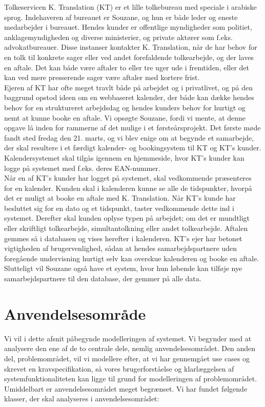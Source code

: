 \documentclass[12pt]{article}   %
\begin{document}
Tolkeservicen K. Translation (KT) er et lille tolkebureau med speciale i arabiske 
sprog. Indehaveren af bureauet er Souzane, og hun er både leder og eneste
medarbejder i bureauet. Hendes kunder er offentlige myndigheder som
politiet, anklagemyndigheden og diverse ministerier, og private aktører som f.eks. advokatbureauer. Disse instanser kontakter K. Translation, når de har
behov for en tolk til konkrete sager eller ved andet forefaldende
tolkearbejde, og der laves en aftale. Det kan både være aftaler to eller tre uger 
ude i fremtiden, eller det kan ved mere presserende sager være aftaler med
kortere frist.\\
Ejeren af KT har ofte meget travlt både på arbejdet og i privatlivet, og på
den baggrund opstod ideen om en webbaseret kalender, der både kan dække hendes behov for en struktureret arbejdsdag og hendes kunders behov for hurtigt og nemt at kunne booke en aftale. Vi opsøgte Souzane, fordi vi mente, at denne opgave lå inden for
rammerne af det mulige i et førsteårsprojekt. Det første møde fandt 
sted fredag den 21. marts, og vi blev enige om at begynde et samarbejde, der
skal resultere i et færdigt kalender- og bookingsystem til KT og KT's kunder.
Kalendersystemet skal tilgås igennem en hjemmeside, hvor KT's kunder
kan logge på systemet med f.eks. deres EAN-nummer. \\
Når en af KT's kunder har logget på systemet, skal vedkommende præsenteres for en
kalender. Kunden skal i kalenderen kunne se alle de tidspunkter,
hvorpå det er muligt at booke en
aftale med K. Translation. Når KT's kunde har besluttet sig for en dato og et tidspunkt,
taster vedkommende dette ind i systemet. Derefter skal kunden oplyse typen på
arbejdet; om det er mundtligt eller skriftligt tolkearbejde, simultantolkning
eller andet tolkearbejde. Aftalen gemmes så i databasen og
vises herefter i kalenderen. KT's ejer har betonet vigtigheden af
brugervenlighed, sådan at hendes samarbejdspartnere uden foregående undervisning 
hurtigt selv kan overskue kalenderen og booke en aftale. Slutteligt vil Souzane også have et system, hvor hun løbende kan tilføje nye samarbejdspartnere til den database, der gemmer på alle data. \\

\section{Anvendelsesområde}
Vi vil i dette afsnit påbegynde modelleringen af systemet. Vi begynder med at analysere den ene af de to centrale dele, nemlig anvendelsesområdet. Den anden del, problemområdet, vil vi modellere efter, at vi har gennemgået use cases og skrevet en kravspecifikation, så vores brugerforståelse og klarlæggelsen af systemfunktionaliteten kan ligge til grund for modelleringen af problemområdet. \\ 
Umiddelbart er anvendelsesområdet meget begrænset. Vi har fundet følgende klasser, der skal analyseres i anvendelsesområdet:
\end{document}
